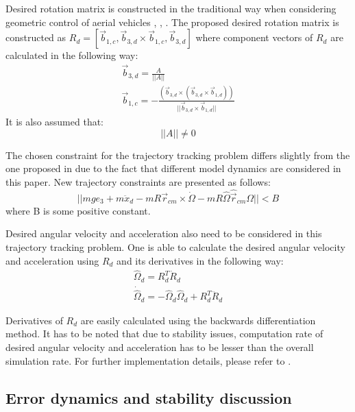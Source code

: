 Desired rotation matrix is constructed in the traditional way when considering geometric control of aerial vehicles \cite{LeeClanak4}, \cite{LeeClanak3}, \cite{LeeClanak2}. The proposed desired rotation matrix is constructed as $R_d = [\vec{b}_{1,c}, \vec{b}_{3,d} \times \vec{b}_{1,c}, \vec{b}_{3,d}]$ where component vectors of $R_d$ are calculated in the following way:
\begin{gather}
	\vec{b}_{3,d} = \frac{A}{|| A ||} \\
	\vec{b}_{1,c} = -\frac{(\vec{b}_{3,d} \times (\vec{b}_{3,d} \times \vec{b}_{1,d}))}{||\vec{b}_{3,d} \times \vec{b}_{1,d}||}
\end{gather}
\noindent It is also assumed that:
\begin{equation}
	|| A || \neq 0 \label{condition1}
\end{equation}

\noindent The chosen constraint for the trajectory tracking problem differs slightly from the one proposed in \cite{LeeClanak4} due to the fact that different model dynamics are considered in this paper. New trajectory constraints are presented as follows:
\begin{equation}
	|| mge_3 + m\ddot{x}_d 
	- mR\vec{r}_{cm}  \times \dot{\Omega} - mR\hat{\Omega}\hat{\vec{r}}_{cm}\Omega|| < B \label{condition2}
\end{equation}
where B is some positive constant. 

Desired angular velocity and acceleration also need to be considered in this trajectory tracking problem. One is able to calculate the desired angular velocity and acceleration using $R_d$ and its derivatives in the following way:
\begin{gather}
	\hat{\Omega}_d = R_d^T \dot{R}_d \\
	\dot{\hat{\Omega}}_d = - \hat{\Omega}_d\hat{\Omega}_d + R_d^T \ddot{R}_d
\end{gather}

Derivatives of $R_d$ are easily calculated using the backwards differentiation method. It has to be noted that due to stability issues, computation rate of desired angular velocity and acceleration has to be lesser than the overall simulation rate. For further implementation details, please refer to \cite{gitLink}.

\subsection{Error dynamics and stability discussion}

